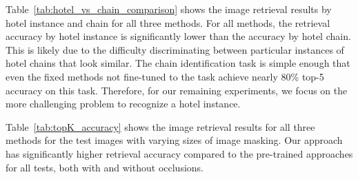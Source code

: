 Table~\ref{tab:hotel_vs_chain_comparison} shows the image retrieval results by hotel instance and chain for all three methods. For all methods, the retrieval accuracy by hotel instance is significantly lower than the accuracy by hotel chain.  This is likely due to the difficulty discriminating between particular instances of hotel chains that look similar. The chain identification task is simple enough that even the fixed methods not fine-tuned to the task achieve
nearly 80\% top-5 accuracy on this task. Therefore, for our remaining
experiments, we focus on the more challenging problem to recognize a hotel instance.

Table~\ref{tab:topK_accuracy} shows the image retrieval results for all three methods for the test images with varying sizes of image masking. Our approach has significantly higher retrieval accuracy compared to the pre-trained approaches for all tests, both with and without occlusions.


